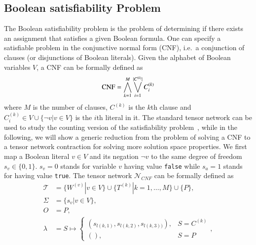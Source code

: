 \documentclass[review, onefignum, onetabnum]{siamart190516}
\begin{document}
\subsection{Boolean satisfiability Problem}
The Boolean satisfiability problem is the problem of determining if there exists an assignment that satisfies a given Boolean formula.
One can specify a satisfiable problem in the conjunctive normal form (CNF), i.e.\ a conjunction of clauses (or disjunctions of Boolean literals).
Given the alphabet of Boolean variables $V$, a CNF can be formally defined as
\begin{equation}
    {\rm CNF} = \bigwedge_{k=1}^{M} \bigvee_{i=1}^{|C^{(k)}|} C^{(k)}_i
\end{equation}
where $M$ is the number of clauses, $C^{(k)}$ is the $k$th clause and $C^{(k)}_i \in V \cup \{\neg v | v \in V\}$ is the $i$th literal in it.
The standard tensor network can be used to study the counting version of the satisfiability problem~\cite{Biamonte2015}, while in the following, we will show a generic reduction from the problem of solving a CNF to a tensor network contraction for solving more solution space properties.
We first map a Boolean literal $v\in V$ and its negation $\neg v$ to the same degree of freedom $s_v \in \{0, 1\}$.
$s_v = 0$ stands for variable $v$ having value \texttt{false} while $s_a=1$ stands for having value \texttt{true}.
The tensor network $\mathcal{N}_{CNF}$ can be formally defined as
\begin{equation}\label{eq:sattensornetwork}
\begin{split}
    \mathcal{T} &= \{W^{(v)} | v \in V\} \cup \{T^{(k)} | k=1,\ldots,M\} \cup \{P\},\\
    \Sigma &= \{s_v | v \in V\},\\
    O &= P,\\
    \lambda &= S \mapsto \begin{cases}
                    (s_{l(k,1)}, s_{l(k, 2)}, s_{l(k,3))}), & S = C^{(k)}\\
                    (), & S = P
                    \end{cases},
\end{split}
\end{equation}
\end{document}

